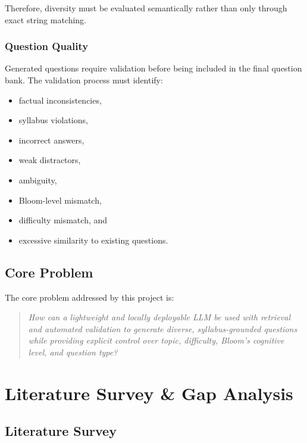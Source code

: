 \documentclass[12pt,a4paper]{report}
\begin{document}
Therefore, diversity must be evaluated semantically rather than only through exact string matching.

\subsection{Question Quality}

Generated questions require validation before being included in the final question bank. The validation process must identify:

\begin{itemize}
    \item factual inconsistencies,
    \item syllabus violations,
    \item incorrect answers,
    \item weak distractors,
    \item ambiguity,
    \item Bloom-level mismatch,
    \item difficulty mismatch, and
    \item excessive similarity to existing questions.
\end{itemize}

\section{Core Problem}

The core problem addressed by this project is:

\begin{quote}
\textit{How can a lightweight and locally deployable LLM be used with retrieval and automated validation to generate diverse, syllabus-grounded questions while providing explicit control over topic, difficulty, Bloom's cognitive level, and question type?}
\end{quote}


\chapter{Literature Survey \& Gap Analysis}

\section{Literature Survey}
\end{document}
